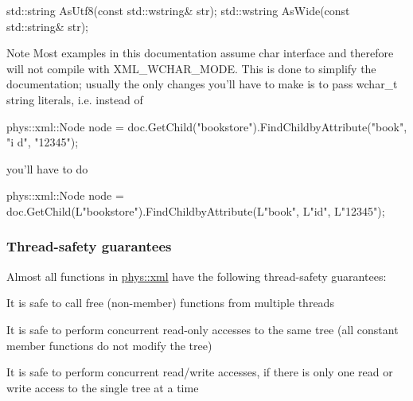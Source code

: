 \begin{DoxyCode}
 std::string AsUtf8(const std::wstring& str);
 std::wstring AsWide(const std::string& str);
\end{DoxyCode}
 \begin{DoxyNote}{Note}
Most examples in this documentation assume char interface and therefore will not compile with XML\_\-WCHAR\_\-MODE. This is done to simplify the documentation; usually the only changes you'll have to make is to pass wchar\_\-t string literals, i.e. instead of \par
 \par
 
\begin{DoxyCode}
 phys::xml::Node node = doc.GetChild("bookstore").FindChildbyAttribute("book", "i
      d", "12345"); 
\end{DoxyCode}
 \par
 \par
 you'll have to do \par
 \par
 
\begin{DoxyCode}
 phys::xml::Node node = doc.GetChild(L"bookstore").FindChildbyAttribute(L"book", 
      L"id", L"12345"); 
\end{DoxyCode}
 \par
 \par
 
\end{DoxyNote}
\hypertarget{XMLManual_XMLThreadSafety}{}\subsubsection{Thread-\/safety guarantees}\label{XMLManual_XMLThreadSafety}
Almost all functions in \hyperlink{namespacephys_1_1xml}{phys::xml} have the following thread-\/safety guarantees:
\begin{DoxyItemize}
\item It is safe to call free (non-\/member) functions from multiple threads
\item It is safe to perform concurrent read-\/only accesses to the same tree (all constant member functions do not modify the tree)
\item It is safe to perform concurrent read/write accesses, if there is only one read or write access to the single tree at a time
\end{DoxyItemize}

